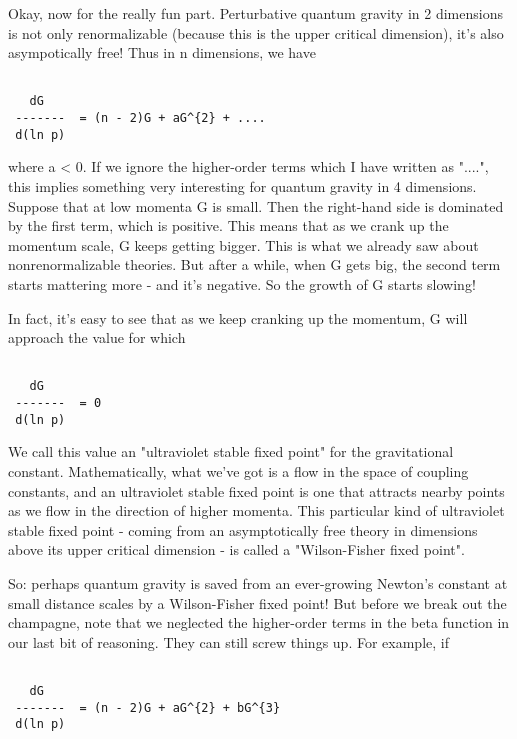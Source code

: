 Okay, now for the really fun part.  Perturbative quantum gravity
in 2 dimensions is not only renormalizable (because this is the 
upper critical dimension), it's also asympotically free!  Thus
in n dimensions, we have


\begin{verbatim}

   dG 
 -------  = (n - 2)G + aG^{2} + ....
 d(ln p)
\end{verbatim}
    
where a < 0.  If we ignore the higher-order terms which I have
written as "....", this implies something very interesting for
quantum gravity in 4 dimensions.  Suppose that at low momenta
G is small.  Then the right-hand side is dominated by the first
term, which is positive.  This means that as we crank up the 
momentum scale, G keeps getting bigger.  This is what we already 
saw about nonrenormalizable theories.  But after a while, when G 
gets big, the second term starts mattering more - and it's negative.
So the growth of G starts slowing!

In fact, it's easy to see that as we keep cranking up the momentum,
G will approach the value for which 


\begin{verbatim}

   dG 
 -------  = 0
 d(ln p)
\end{verbatim}
    
We call this value an "ultraviolet stable 
fixed point" for the gravitational
constant.  Mathematically, what we've got is a flow in the space 
of coupling constants, and an ultraviolet stable fixed point is one
that attracts nearby points as we flow in the direction of higher 
momenta.  This particular kind of ultraviolet stable fixed point - coming 
from an asymptotically free theory in dimensions above its upper 
critical dimension - is called a "Wilson-Fisher fixed point".  

So: perhaps quantum gravity is saved from an ever-growing Newton's
constant at small distance scales by a Wilson-Fisher fixed point!
But before we break out the champagne, note that we neglected the
higher-order terms in the beta function in our last bit of reasoning.
They can still screw things up.  For example, if


\begin{verbatim}

   dG 
 -------  = (n - 2)G + aG^{2} + bG^{3} 
 d(ln p)
\end{verbatim}
    
